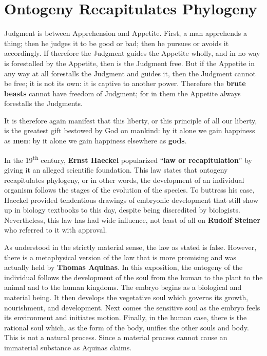 \section{Ontogeny Recapitulates Phylogeny}

\begin{quotationx}
Judgment is between Apprehension and Appetite. First, a man apprehends a thing; then he judges it to be good or bad; then he pursues or avoids it accordingly. If therefore the Judgment guides the Appetite wholly, and in no way is forestalled by the Appetite, then is the Judgment free. But if the Appetite in any way at all forestalls the Judgment and guides it, then the Judgment cannot be free; it is not its own: it is captive to another power. Therefore the \textbf{brute beasts} cannot have freedom of Judgment; for in them the Appetite always forestalls the Judgments.

It is therefore again manifest that this liberty, or this principle of all our liberty, is the greatest gift bestowed by God on mankind: by it alone we gain happiness as \textbf{men}: by it alone we gain happiness elsewhere as \textbf{gods}.

\end{quotationx}

In the 19\textsuperscript{th} century, \textbf{Ernst Haeckel} popularized ``\textbf{law or recapitulation}'' by giving it an alleged scientific foundation. This law states that ontogeny recapitulates phylogeny, or in other words, the development of an individual organism follows the stages of the evolution of the species. To buttress his case, Haeckel provided tendentious drawings of embryonic development that still show up in biology textbooks to this day, despite being discredited by biologists. Nevertheless, this law has had wide influence, not least of all on \textbf{Rudolf Steiner} who referred to it with approval.

As understood in the strictly material sense, the law as stated is false. However, there is a metaphysical version of the law that is more promising and was actually held by \textbf{Thomas Aquinas}. In this exposition, the ontogeny of the individual follows the development of the soul from the human to the plant to the animal and to the human kingdoms. The embryo begins as a biological and material being. It then develops the vegetative soul which governs its growth, nourishment, and development. Next comes the sensitive soul as the embryo feels its environment and initiates motion. Finally, in the human case, there is the rational soul which, as the form of the body, unifies the other souls and body. This is not a natural process. Since a material process cannot cause an immaterial substance as Aquinas claims.

